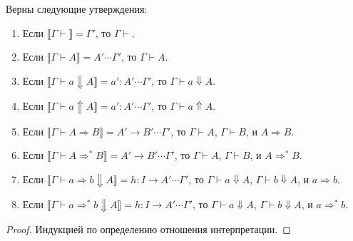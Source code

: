 \documentclass{amsart}
\theoremstyle{definition}
\theoremstyle{remark}
\newcommand{\red}{\Rightarrow}
\renewcommand{\ll}{\llbracket}
\newcommand{\rr}{\rrbracket}
\numberwithin{figure}{section}
\begin{document}
\begin{lem}
Верны следующие утверждения:
\begin{enumerate}
\item Если $\ll \Gamma \vdash \rr = \Gamma'$, то $\Gamma \vdash$.
\item Если $\ll \Gamma \vdash A \rr = A' \dotsb \Gamma'$, то $\Gamma \vdash A$.
\item Если $\ll \Gamma \vdash a \Downarrow A \rr = a' : A' \dotsb \Gamma'$, то $\Gamma \vdash a \Downarrow A$.
\item Если $\ll \Gamma \vdash a \Uparrow A \rr = a' : A' \dotsb \Gamma'$, то $\Gamma \vdash a \Uparrow A$.
\item Если $\ll \Gamma \vdash A \red B \rr = A' \to B' \dotsb \Gamma'$, то $\Gamma \vdash A$, $\Gamma \vdash B$, и $A \red B$.
\item Если $\ll \Gamma \vdash A \red^* B \rr = A' \to B' \dotsb \Gamma'$, то $\Gamma \vdash A$, $\Gamma \vdash B$, и $A \red^* B$.
\item Если $\ll \Gamma \vdash a \red b \Downarrow A \rr = h : I \to A' \dotsb \Gamma'$, то $\Gamma \vdash a \Downarrow A$, $\Gamma \vdash b \Downarrow A$, и $a \red b$.
\item Если $\ll \Gamma \vdash a \red^* b \Downarrow A \rr = h : I \to A' \dotsb \Gamma'$, то $\Gamma \vdash a \Downarrow A$, $\Gamma \vdash b \Downarrow A$, и $a \red^* b$.
\end{enumerate}
\end{lem}
\begin{proof}
Индукцией по определению отношения интерпретации.
\end{proof}
\end{document}
